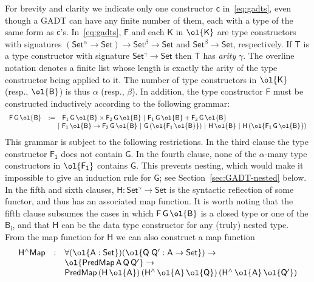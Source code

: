 \documentclass[sigplan,10pt,anonymous,review]{acmart}
\begin{document}
\noindent
For brevity and clarity we indicate only one constructor $\mathsf{c}$
in~\eqref{eq:gadts}, even though a GADT can have any finite number of
them, each with a type of the same form as
$\mathsf{c}$'s. In~\eqref{eq:gadts}, $\mathsf{F}$ and each
$\mathsf{K}$ in $\ol{\mathsf{K}}$ are type constructors with
signatures $\mathsf{(Set^{\alpha} \to Set) \to Set^{\beta} \to Set}$
and $\mathsf{Set^{\beta} \to Set}$, respectively. If $\mathsf{T}$ is a
type constructor with signature $\mathsf{Set^{\gamma} \to Set}$ then
$\mathsf{T}$ has {\em arity} $\mathsf{\gamma}$.  The
overline notation denotes a finite list whose length is exactly the
arity of the type constructor being applied to it. The number of type
constructors in $\ol{\mathsf{K}}$ (resp., $\ol{\mathsf{B}}$) is thus
$\alpha$ (resp., $\beta$). In addition, the type constructor
$\mathsf{F}$ must be constructed inductively according to the
following grammar:
\[\begin{array}{lll}
\mathsf{F\,G\,\ol{B}} & := &
\mathsf{F_1\,G\,\ol{B} \times F_2\,G\,\ol{B} \ \vert\ F_1\,G\,\ol{B} +
  F_2\,G\,\ol{B}}\\
& & \!\!\!\!\mathsf{\vert\ F_1\,\ol{B} \to F_2\,G\,\ol{B}
\ \vert\ G\,(\ol{F_1\,\ol{B}}) \ \vert\ H\,\ol{B} \ \vert\ H\,
(\ol{F_1\,G\,\ol{B}}) }
\end{array}\]
This grammar is subject to the following restrictions. In the third
clause the type constructor $\mathsf{F_1}$ does not contain
$\mathsf{G}$. In the fourth clause, none of the $\mathsf{\alpha}$-many
type constructors in $\mathsf{\ol{F_1}}$ contains $\mathsf{G}$. This
prevents nesting, which would make it impossible to give an induction
rule for $\mathsf{G}$; see Section~\ref{sec:GADT-nested} below. In the
fifth and sixth clauses, $\mathsf{H : Set^\gamma \to Set}$ is the
syntactic reflection of some functor, and thus has an associated map
function. It is worth noting that the fifth clause subsumes the cases
in which $\mathsf{F\,G\,\ol{B}}$ is a closed type or one of the
$\mathsf{B_i}$, and that $\mathsf{H}$ can be the data type constructor
for any (truly) nested type. From the map function for $\mathsf{H}$ we
can also construct a map function
\begin{equation}\label{eq:hliftmap}
\begin{array}{lll}
\mathsf{H^\wedge Map} & : & \mathsf{\forall (\ol{A : Set}) (\ol{Q\;Q'
    : A \to Set}) \to}\\
& & \mathsf{\ol{PredMap\,A\,Q\,Q'} \to}\\
& & \mathsf{PredMap\,(H\,\ol{A})\,(H^{\wedge}\,\ol{A}\,\ol{Q})\, 
(H^{\wedge}\,\ol{A}\,\ol{Q'})}
\end{array}
\end{equation}
\end{document}

